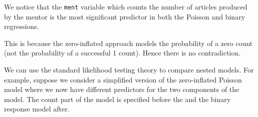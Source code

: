 \documentclass[
  ignorenonframetext,
]{beamer}
\begin{document}
\begin{frame}{}
\protect\hypertarget{section-43}{}
We notice that the \texttt{ment} variable which counts the number of
articles produced by the mentor is the most significant predictor in
both the Poisson and binary regressions.

\vspace{12pt}

This is because the zero-inflated approach models the probability of a
zero count (not the probability of a successful 1 count). Hence there is
no contradiction.

\vspace{12pt}

We can use the standard likelihood testing theory to compare nested
models. For example, suppose we consider a simplified version of the
zero-inflated Poisson model where we now have different predictors for
the two components of the model. The count part of the model is
specified before the \textbar{} and the binary response model after.
\end{frame}
\end{document}
